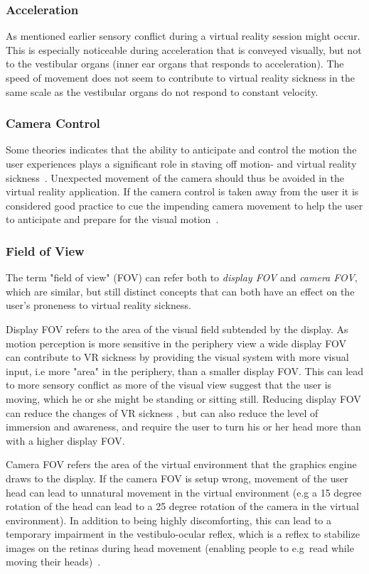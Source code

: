 \subsubsection{Acceleration}
As mentioned earlier sensory conflict during a virtual reality session might occur. This is especially noticeable during acceleration that is conveyed visually, but 
not to the vestibular organs (inner ear organs that responds to acceleration). The speed of movement does not seem to contribute to virtual reality sickness in the same scale
as the vestibular organs do not respond to constant velocity. %

\subsubsection{Camera Control}
\label{sec:camera_control}
Some theories indicates that the ability to anticipate and control the motion the user experiences plays a significant role in staving off motion- 
and virtual reality sickness~\citep{Rolnick1991}. Unexpected movement of the camera should thus be avoided in the virtual reality application. 
If the camera control is taken away from the user it is considered good practice to cue the impending camera movement to help the user to anticipate and prepare for 
the visual motion~\citep{Lin2004}.

\subsubsection{Field of View}
\label{sec:fov}
The term "field of view" (FOV) can refer both to \textit{display FOV} and \textit{camera FOV}, which are similar, 
but still distinct concepts that can both have an effect on the user's proneness to virtual reality sickness. 

Display FOV refers to the area of the visual field subtended by the display. As motion perception is more sensitive in the periphery view 
a wide display FOV can contribute to VR sickness by providing the visual system with more visual input, i.e more "area" in the periphery, than a smaller display FOV. 
This can lead to more sensory conflict as more of the visual view suggest that the user is moving, which he or she might be standing or sitting still.
Reducing display FOV can reduce the changes of VR sickness \citep{Draper2001}, but can also reduce the level of immersion and awareness, and require the user to turn his or her head more
than with a higher display FOV.

Camera FOV refers the area of the virtual environment that the graphics engine draws to the display.
If the camera FOV is setup wrong, movement of the user head can lead to unnatural movement in the virtual environment (e.g a 15 degree rotation of the head can lead to a 
25 degree rotation of the camera in the virtual environment). In addition to being highly discomforting, this can lead to a temporary impairment in the vestibulo-ocular reflex, 
which is a reflex to stabilize images on the retinas during head movement (enabling people to e.g~read while moving their heads)~\citep{Stanney2002}.


